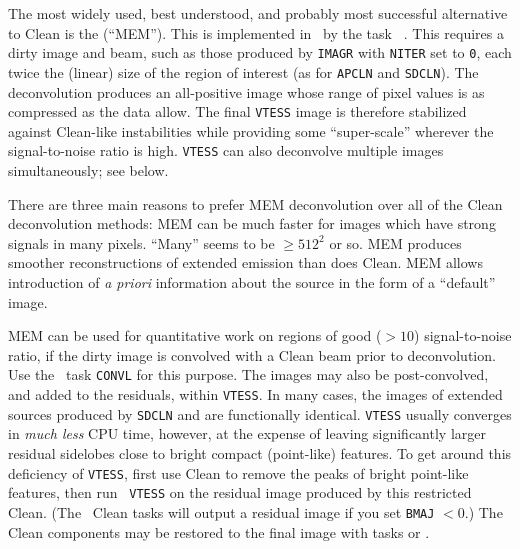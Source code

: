       The most widely used, best understood, and probably most
successful alternative to Clean is the 
(``MEM'').  This is implemented in \AIPS\ by the task {\tt
{}}.  This  requires a dirty image and beam, such as those
produced by {\tt IMAGR} with {\tt NITER} set to {\tt 0}, each twice
the (linear) size of the region of interest (as for {\tt APCLN} and
{\tt SDCLN})\@.  The deconvolution produces an all-positive image
whose range of pixel values is as compressed as the data allow.  The
final {\tt VTESS} image is therefore stabilized against Clean-like
instabilities while providing some ``super-scale'' wherever the
signal-to-noise ratio is high.  {\tt VTESS} can also deconvolve
multiple images simultaneously; see below.

     There are three main reasons to prefer MEM deconvolution over all
of the Clean deconvolution methods:
\xben
\Item MEM can be much faster for images which have strong
   signals in many pixels.  ``Many'' seems to be $\geq 512^2$ or so.
\Item MEM produces smoother reconstructions of extended emission
   than does Clean.
\Item MEM allows introduction of {\it a priori\/} information about
   the source in the form of a ``default'' image.
\xeen
{}

     MEM can be used for quantitative work on regions of good ($> 10$)
signal-to-noise ratio, if the dirty image is convolved with a Clean
beam prior to deconvolution.  Use the \AIPS\ task {\tt CONVL} for this
purpose.  The images may also be post-convolved, and added to the
residuals, within {\tt VTESS}\@.  In many cases, the images of
extended sources produced by {\tt SDCLN} and {\tt {}} are
functionally identical.  {\tt VTESS} usually converges in {\it much
less\/} CPU time, however, at the expense of leaving significantly
larger residual sidelobes close to bright compact (point-like)
features.  To get around this deficiency of {\tt VTESS}, first use
Clean to remove the peaks of bright point-like features, then run {\tt
VTESS} on the residual image produced by this restricted Clean.  (The
\AIPS\ Clean tasks will output a residual image if you set {\tt BMAJ}
$<0$.)  The Clean components may be restored to the final image with
tasks {\tt {}} or {\tt {}}\@.

